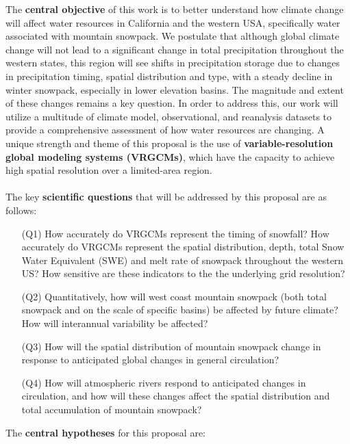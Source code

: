 \documentclass[11pt]{article}
\begin{document}
The \textbf{central objective} of this work is to better understand how climate change will affect water resources in California and the western USA, specifically water associated with mountain snowpack.  We postulate that although global climate change will not lead to a significant change in total precipitation throughout the western states, this region will see shifts in precipitation storage due to changes in precipitation timing, spatial distribution and type, with a steady decline in winter snowpack, especially in lower elevation basins.  The magnitude and extent of these changes remains a key question.  In order to address this, our work will utilize a multitude of climate model, observational, and reanalysis datasets to provide a comprehensive assessment of how water resources are changing.  A unique strength and theme of this proposal is the use of \textbf{variable-resolution global modeling systems (VRGCMs)}, which have the capacity to achieve high spatial resolution over a limited-area region.
\\\\
The key \textbf{scientific questions} that will be addressed by this proposal are as follows:

\vspace{-0.4cm}
\begin{itemize}
\item[(Q1)] How accurately do VRGCMs represent the timing of snowfall?  How accurately do VRGCMs represent the spatial distribution, depth, total Snow Water Equivalent (SWE) and melt rate of snowpack throughout the western US?  How sensitive are these indicators to the the underlying grid resolution?

\item[(Q2)] Quantitatively, how will west coast mountain snowpack (both total snowpack and on the scale of specific basins) be affected by future climate?  How will interannual variability be affected?

\item[(Q3)] How will the spatial distribution of mountain snowpack change in response to anticipated global changes in general circulation?

\item[(Q4)] How will atmospheric rivers respond to anticipated changes in circulation, and how will these changes affect the spatial distribution and total accumulation of mountain snowpack?
\end{itemize}

\noindent The \textbf{central hypotheses} for this proposal are:
\end{document}

